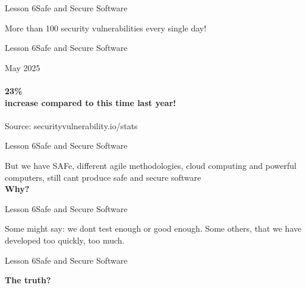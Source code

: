 \documentclass[aspectratio=1610]{beamer}
\begin{document}
\begin{frame}{Lesson 6}{Safe and Secure Software}
\Huge
\begin{center}
More than 100 security vulnerabilities every single day!
\end{center}
\end{frame}



\begin{frame}{Lesson 6}{Safe and Secure Software}
\Huge
\begin{center}
May 2025\\~\\
\textbf{23\%\\
 increase compared to this time last year!}\\~\\ 
\large
Source: securityvulnerability.io/stats
\end{center}
\end{frame}


\begin{frame}
\end{frame}



\begin{frame}{Lesson 6}{Safe and Secure Software}
\Huge
\begin{center}
But we have SAFe, different agile methodologies, cloud computing and powerful computers, still cant produce safe and secure software\\
\textbf{Why?}
\end{center}
\end{frame}



\begin{frame}{Lesson 6}{Safe and Secure Software}
\Huge
\begin{center}
Some might say: we dont test enough or good enough. Some others, that we have developed 
too quickly, too much.
\end{center}
\end{frame}


\begin{frame}{Lesson 6}{Safe and Secure Software}
\Huge
\begin{center}
\textbf{The truth?}
\end{center}
\end{frame}


\begin{frame}
\end{frame}
\end{document}
